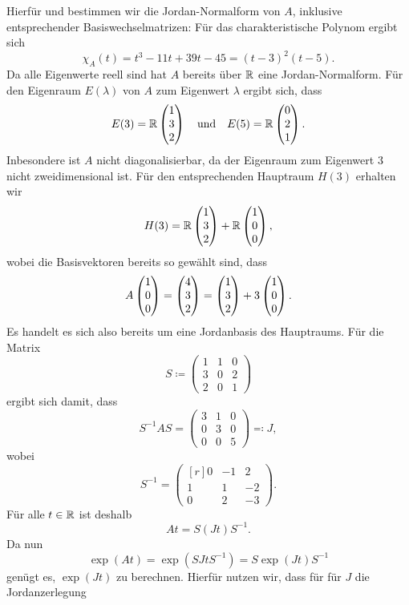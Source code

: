 \documentclass[a4paper, 10pt]{article}
\begin{document}
Hierfür und bestimmen wir die Jordan-Normalform von $A$, inklusive entsprechender Basiswechselmatrizen:
Für das charakteristische Polynom ergibt sich
\[
    \chi_A(t)
  = t^3 - 11t + 39t - 45
  = (t-3)^2 (t-5).
\]
Da alle Eigenwerte reell sind hat $A$ bereits über $\mathbb{R}$ eine Jordan-Normalform.
Für den Eigenraum $E(\lambda)$ von $A$ zum Eigenwert $\lambda$ ergibt sich, dass
\[
  E(3) = \mathbb{R} \begin{pmatrix} 1 \\ 3 \\ 2 \end{pmatrix}
  \quad\text{und}\quad
  E(5) = \mathbb{R} \begin{pmatrix} 0 \\ 2 \\ 1 \end{pmatrix}.
\]
Inbesondere ist $A$ nicht diagonalisierbar, da der Eigenraum zum Eigenwert $3$ nicht zweidimensional ist.
Für den entsprechenden Hauptraum $H(3)$ erhalten wir
\[
    H(3)
  = \mathbb{R} \begin{pmatrix} 1 \\ 3 \\ 2 \end{pmatrix} + \mathbb{R} \begin{pmatrix} 1 \\ 0 \\ 0 \end{pmatrix},
\]
wobei die Basisvektoren bereits so gewählt sind, dass
\[
    A \begin{pmatrix} 1 \\ 0 \\ 0 \end{pmatrix}
  = \begin{pmatrix} 4 \\ 3 \\ 2 \end{pmatrix}
  = \begin{pmatrix} 1 \\ 3 \\ 2 \end{pmatrix}+ 3 \begin{pmatrix} 1 \\ 0 \\ 0 \end{pmatrix}.
\]
Es handelt es sich also bereits um eine Jordanbasis des Hauptraums.
Für die Matrix
\[
  S
  \coloneqq
  \begin{pmatrix}
    1 & 1 & 0 \\
    3 & 0 & 2 \\
    2 & 0 & 1
  \end{pmatrix}
\]
ergibt sich damit, dass
\[
  S^{-1} A S
  =
  \begin{pmatrix}
    3 & 1 & 0 \\
    0 & 3 & 0 \\
    0 & 0 & 5
  \end{pmatrix}
  \eqqcolon J,
\]
wobei
\[
  S^{-1}
  =
  \begin{pmatrix*}[r]
    0 & -1  &  2  \\
    1 &  1  & -2  \\
    0 &  2  & -3
  \end{pmatrix*}.
\]
Für alle $t \in \mathbb{R}$ ist deshalb
\[
  At = S (Jt) S^{-1}.
\]
Da nun
\[
    \exp(At)
  = \exp(S Jt S^{-1})
  = S \exp(Jt) S^{-1}
\]
genügt es, $\exp(Jt)$ zu berechnen.
Hierfür nutzen wir, dass für für $J$ die Jordanzerlegung
\end{document}
